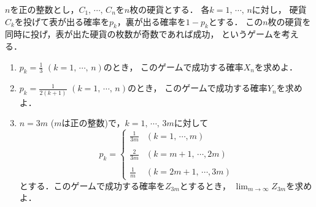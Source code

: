 \documentclass[../../main.tex]{subfiles}
\begin{document}
$n$を正の整数とし，$C_1, \, \cdots, \, C_n$を$n$枚の硬貨とする．
各$k=1, \, \cdots, \, n$に対し，
硬貨$C_k$を投げて表が出る確率を$p_k$，裏が出る確率を$1-p_k$とする．
この$n$枚の硬貨を同時に投げ，表が出た硬貨の枚数が奇数であれば成功，
というゲームを考える．
\begin{enumerate}
  \item$\displaystyle p_k=\frac{1}{3}$ $(k=1, \, \cdots, \, n)$のとき，
    このゲームで成功する確率$X_n$を求めよ．
  \item$\displaystyle p_k=\frac{1}{2(k+1)}$ $(k=1, \, \cdots, \, n)$のとき，
    このゲームで成功する確率$Y_n$を求めよ．
  \item$n=3m$ ($m$は正の整数)で，$k=1, \, \cdots, \, 3m$に対して
    \[ p_k=
      \begin{cases} \displaystyle \frac{1}{3m} & (k=1, \, \cdots, m) \\
        \\
        \displaystyle \frac{2}{3m} & (k=m+1, \, \cdots, 2m) \\
        \\
        \displaystyle \frac{1}{m} & (k=2m+1, \, \cdots, 3m)
    \end{cases} \]
    とする．このゲームで成功する確率を$Z_{3m}$とするとき，
    $\displaystyle\lim_{m\to\infty}Z_{3m}$を求めよ．
\end{enumerate}
\end{document}
